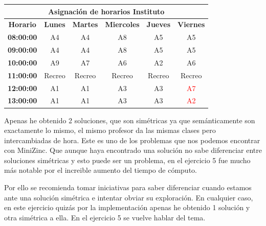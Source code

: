 \documentclass[12pt,letterpaper]{article}
\numberwithin{equation}{section} %
\numberwithin{figure}{section} %
\numberwithin{table}{section} %
\begin{document}
\begin{table}[H]
{\begin{tabular}{|cccccc|}
\hline
\multicolumn{6}{|c|}{\textbf{Asignación de horarios Instituto}}                                                                                                                                                          \\ \hline
\multicolumn{1}{|c|}{\textbf{Horario}}  & \multicolumn{1}{c|}{\textbf{Lunes}} & \multicolumn{1}{c|}{\textbf{Martes}} & \multicolumn{1}{c|}{\textbf{Miercoles}} & \multicolumn{1}{c|}{\textbf{Jueves}} & \textbf{Viernes} \\ \hline
\multicolumn{1}{|c|}{\textbf{08:00:00}} & \multicolumn{1}{c|}{A4}             & \multicolumn{1}{c|}{A4}              & \multicolumn{1}{c|}{A8}                 & \multicolumn{1}{c|}{A5}              & A5               \\ \hline
\multicolumn{1}{|c|}{\textbf{09:00:00}} & \multicolumn{1}{c|}{A4}             & \multicolumn{1}{c|}{A4}              & \multicolumn{1}{c|}{A8}                 & \multicolumn{1}{c|}{A5}              & A5               \\ \hline
\multicolumn{1}{|c|}{\textbf{10:00:00}} & \multicolumn{1}{c|}{A9}             & \multicolumn{1}{c|}{A7}              & \multicolumn{1}{c|}{A6}                 & \multicolumn{1}{c|}{A2}              & A6               \\ \hline
\multicolumn{1}{|c|}{\textbf{11:00:00}} & \multicolumn{1}{c|}{Recreo}         & \multicolumn{1}{c|}{Recreo}          & \multicolumn{1}{c|}{Recreo}             & \multicolumn{1}{c|}{Recreo}          & Recreo           \\ \hline
\multicolumn{1}{|c|}{\textbf{12:00:00}} & \multicolumn{1}{c|}{A1}             & \multicolumn{1}{c|}{A1}              & \multicolumn{1}{c|}{A3}                 & \multicolumn{1}{c|}{A3}              & \textcolor{red}{A7}               \\ \hline
\multicolumn{1}{|c|}{\textbf{13:00:00}} & \multicolumn{1}{c|}{A1}             & \multicolumn{1}{c|}{A1}              & \multicolumn{1}{c|}{A3}                 & \multicolumn{1}{c|}{A3}              & \textcolor{red}{A2}               \\ \hline
\end{tabular}
}
\end{table}

Apenas he obtenido 2 soluciones, que son simétricas ya que semánticamente son
exactamente lo mismo, el mismo profesor da las mismas clases pero intercambiadas
de hora. Este es uno de los problemas que nos podemos encontrar con MiniZinc.
Que aunque haya encontrado una solución no sabe diferenciar entre soluciones
simétricas y esto puede ser un problema, en el ejercicio 5 fue mucho más notable
por el increible aumento del tiempo de cómputo.
\par
Por ello se recomienda tomar iniciativas para saber diferenciar cuando estamos
ante una solución simétrica e intentar obviar su exploración. En cualquier
caso, en este ejercicio quizás por la implementación apenas he obtenido
1 solución y otra simétrica a ella. En el ejercicio 5 se vuelve hablar del tema.
\end{document}
